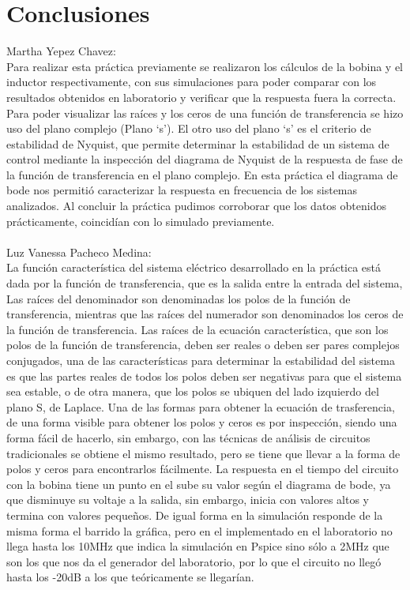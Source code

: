 \documentclass[12pt,letterpaper]{article}     %
\begin{document}
\section{Conclusiones}
Martha Yepez Chavez:\\
Para realizar esta práctica previamente se realizaron los cálculos de la bobina y el inductor respectivamente, con sus simulaciones para poder comparar con los resultados obtenidos en laboratorio y verificar que la respuesta fuera la correcta. Para poder visualizar las raíces y los ceros de una función de transferencia se hizo uso  del plano complejo (Plano ‘s’). El otro uso del plano ‘s’ es el criterio de estabilidad de Nyquist, que permite determinar la estabilidad de un sistema de control mediante la inspección del diagrama de Nyquist de la respuesta de fase de la función de transferencia en el plano complejo. En esta práctica el diagrama de bode nos permitió caracterizar la respuesta en frecuencia de los sistemas analizados. Al concluir la práctica pudimos corroborar que los datos obtenidos prácticamente, coincidían con lo simulado previamente.
\\\\
Luz Vanessa Pacheco Medina:\\
La función característica del sistema eléctrico desarrollado en la práctica está dada por la función de transferencia, que es la salida entre la entrada del sistema, Las raíces del denominador son denominadas los polos de la función de transferencia, mientras que las raíces del numerador son denominados los ceros de la función de transferencia.
Las raíces de la ecuación característica, que son los polos de la función de transferencia, deben ser reales o deben ser pares complejos conjugados, una de las características para determinar la estabilidad del sistema es que las partes reales de todos los polos deben ser negativas para que el sistema sea estable, o de otra manera, que los polos se ubiquen del lado izquierdo del plano S, de Laplace.
Una de las formas para obtener la ecuación de trasferencia, de una forma visible para obtener los polos y ceros es por inspección, siendo una forma fácil de hacerlo, sin embargo, con las técnicas de análisis de circuitos tradicionales se obtiene el mismo resultado, pero se tiene que llevar a la forma de polos y ceros para encontrarlos fácilmente.
La respuesta en el tiempo del circuito con la bobina tiene un punto en el sube su valor según el diagrama de bode, ya que disminuye su voltaje a la salida, sin embargo, inicia con valores altos y termina con valores pequeños. De igual forma en la simulación responde de la misma forma el barrido la gráfica, pero en el implementado en el laboratorio no llega hasta los 10MHz que indica la simulación en Pspice sino sólo a 2MHz que son los que nos da el generador del laboratorio, por lo que el circuito no llegó hasta los -20dB a los que teóricamente se llegarían. 
\end{document}
